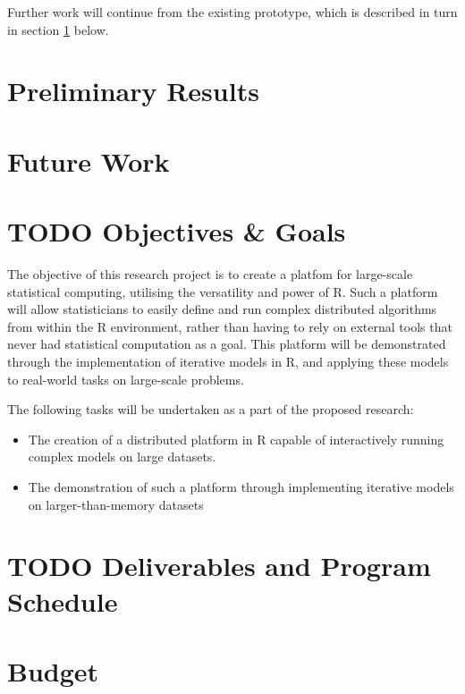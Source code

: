 \documentclass[a4paper,10pt]{article}
\begin{document}
Further work will continue from the existing prototype, which is described in turn in section \ref{curr} below.

\section{Preliminary Results}\label{curr}



\section{Future Work}


\section{TODO Objectives \& Goals}

The objective of this research project is to create a platfom for large-scale statistical computing, utilising the versatility and power of R.
Such a platform will allow statisticians to easily define and run complex distributed algorithms from within the R environment, rather than having to rely on external tools that never had statistical computation as a goal.
This platform will be demonstrated through the implementation of iterative models in R, and applying these models to real-world tasks on large-scale problems.

The following tasks will be undertaken as a part of the proposed research:

\begin{itemize}
	\item The creation of a distributed platform in R capable of
		interactively running complex models on large datasets.
	\item The demonstration of such a platform through implementing
		iterative models on larger-than-memory datasets
\end{itemize}

\section{TODO Deliverables and Program Schedule}


\section{Budget}
\end{document}
